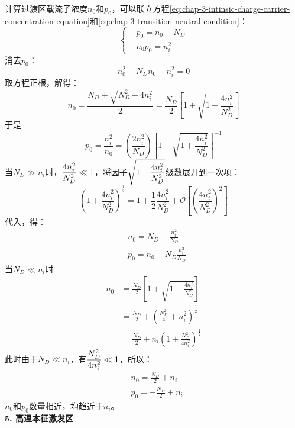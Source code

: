 计算过渡区载流子浓度$n_0$和$p_0$，可以联立方程\autoref{eq:chap-3-intinsic-charge-carrier-concentration-equation}和\autoref{eq:chap-3-transition-neutral-condition}：
\begin{equation}
    \left\{
    \begin{aligned}
        &p_0=n_0-N_D\\
        &n_0p_0=n_i^2
    \end{aligned}
    \right.
\end{equation}
消去$p_0$：
\begin{equation}
    n_0^2-N_Dn_0-n_i^2=0
\end{equation}
取方程正根，解得：
\begin{equation}
    n_0=\frac{N_D+\sqrt{N_D^2+4n_i^2}}{2}=\frac{N_D}{2}\left[1+\sqrt{1+\frac{4n_i^2}{N_D^2}}\right]
\end{equation}
于是
\begin{equation}
    p_0=\frac{n_i^2}{n_0}=\left(\frac{2n_i^2}{N_D}\right)\left[1+\sqrt{1+\frac{4n_i^2}{N_D^2}}\right]^{-1}
\end{equation}
\vspace{1ex}当$N_D\gg n_i$时，$\displaystyle \frac{4n_i^2}{N_D^2}\ll 1$，将因子$\displaystyle \sqrt{1+\frac{4n_i^2}{N_D^2}}$级数展开到一次项：
\begin{equation}
    \left(1+\frac{4n_i^2}{N_D^2}\right)^\frac{1}{2}=1+\frac{1}{2}\frac{4n_i^2}{N_D^2}+\mathcal{O}\left[\left(\frac{4n_i^2}{N_D^2}\right)^2\right]
\end{equation}
代入，得：
\begin{align}
    &n_0=N_D+\frac{n_i^2}{N_D}\\
    &p_0=n_0-N_D\frac{n_i^2}{N_D}
\end{align}
当$N_D\ll n_i$时
\begin{align}
    n_0&=\frac{N_D}{2}\left[1+\sqrt{1+\frac{4n_i^2}{N_D^2}}\right]\\
    &=\frac{N_D}{2}+\left(\frac{N_D^2}{4}+n_i^2\right)^\frac{1}{2}\\
    &=\frac{N_D}{2}+n_i\left(1+\frac{N_D^2}{4n_i^2}\right)^\frac{1}{2}
\end{align}
\vspace{1ex}此时由于$N_D\ll n_i$，有$\displaystyle \frac{N_D^2}{4n_i^2}\ll 1$，所以：
\begin{align}
    &n_0=\frac{N_D}{2}+n_i\\
    &p_0=-\frac{N_D}{2}+n_i
\end{align}
$n_0$和$p_0$数量相近，均趋近于$n_i$。\vspace{1ex}\\
\textbf{5. 高温本征激发区}\vspace{1ex}

